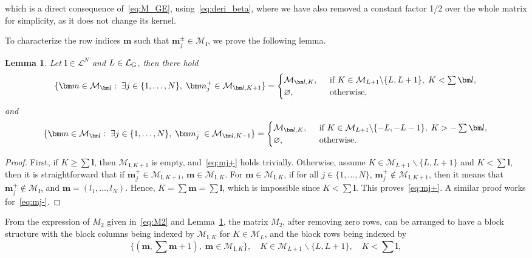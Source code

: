 \documentclass{article}
\newtheorem{lemma}[theorem]{Lemma}
\numberwithin{equation}{section}
\def\bl{{\bm l}}
\def\bbm{{\bm m}}
\def\calM{\mathcal{M}}
\def\calL{\mathcal{L}}
\def\calLG{\mathcal{\calL_{\rm G}}}
\def\MlL{{M}}
\def\Nat{{N}}
\begin{document}
which is a direct consequence of~\eqref{eq:M_GE}, using~\eqref{eq:deri_beta}, where we have also removed a constant factor 1/2 over the whole matrix for simplicity, as it does not change its kernel.


To characterize the row indices $\bbm$ such that $\bbm^\pm_j\in\calM_\bl$, we prove the following lemma. 

\begin{lemma}\label{lem:row_ind}
Let $\bl\in\calL^N$ and $L \in \calLG$, then there hold
\begin{equation}
    \label{eq:mj+}
    \{\bbm\in\calM_{\bl}:\; \exists j\in \{ 1,\ldots, \Nat\},\; \bbm_j^+ \in \calM_{\bl,K+1}\} = \begin{cases}
        \calM_{\bl,K}, & \;\; \textup{if }K\in\calM_{L+1}\backslash\{L,L+1\}, \; K<\sum\bl, \\
        \varnothing, & \;\; \textup{otherwise,}
    \end{cases}
\end{equation}
and 
\begin{equation}
    \label{eq:mj-}
    \{\bbm\in\calM_{\bl}:\; \exists j\in \{ 1,\ldots, \Nat\},\;\bbm_j^- \in \calM_{\bl,K-1}\} = \begin{cases}
        \calM_{\bl,K}, & \;\; \textup{if }K\in\calM_{L+1}\backslash\{-L,-L-1\}, \; K>-\sum\bl, \\
        \varnothing, & \;\; \textup{otherwise.}
    \end{cases}
\end{equation}
\end{lemma}
\begin{proof}
    First, if $K\ge\sum\bl$, then $\calM_{\bl,K+1}$ is empty, and~\eqref{eq:mj+} holds trivially. 
    Otherwise, assume $K\in\calM_{L+1}\backslash\{L,L+1\}$ and $K<\sum\bl$, then it is straightforward that if $\bbm_j^+\in\calM_{\bl,K+1}$, $\bbm\in\calM_{\bl,K}$. For $\bbm\in\calM_{\bl,K}$,
    if for all $j\in \{1,\ldots,\Nat\}$, $\bbm_j^+ \notin \calM_{\bl,K+1}$, then it means that $\bbm_j^+ \notin \calM_{\bl}$, and 
    $\bbm = (l_1, \ldots, l_\Nat)$.
    Hence, 
    $K=\sum\bbm = \sum\bl$, which is impossible since $K<\sum\bl$. This proves~\eqref{eq:mj+}.
    A similar proof works for~\eqref{eq:mj-}. 
\end{proof}


From the expression of $\MlL_2$ given in~\eqref{eq:M2} and Lemma~\ref{lem:row_ind}, the matrix $\MlL_2$, after removing zero rows, can be arranged to have a block structure with the block 
columns being indexed by $\calM_{\bl,K}$ for $K\in\calM_L$, and 
the block rows being indexed by 
\begin{equation}\label{eq:MlK_minus}
    \big\{ (\bbm, {\sum}\bbm+1), \;  \bbm \in \calM_{\bl,K} \big\},
\quad K \in \calM_{L+1} \backslash \{ L, L+1\}, \quad K<\sum\bl,
\end{equation}
\end{document}
